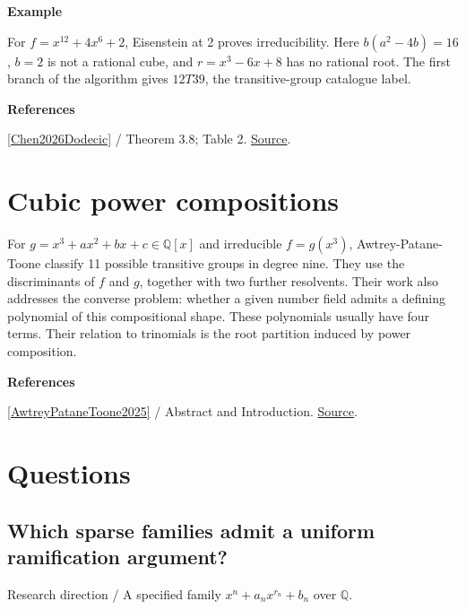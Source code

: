 \documentclass[11pt,a4paper,oneside,openany]{book}
\newenvironment{sources}{\par\smallskip\begingroup\footnotesize\color{atlasgray}\leftskip=10pt\setlength{\parskip}{2pt}}{\par\endgroup\smallskip}
\begin{document}
\begin{atlasblock}[standard]
\textbf{\sffamily Example}\par\smallskip
\color{black} For \(f=x^{12}+4x^6+2\), Eisenstein at 2 proves irreducibility. Here \(b(a^2-4b)=16\), \(b=2\) is not a rational cube, and \(r=x^3-6x+8\) has no rational root. The first branch of the algorithm gives \(12T39\), the transitive-group catalogue label.\par
\end{atlasblock}\color{black}
\begin{sources}
\textbf{References}\par\smallskip
\noindent\hyperlink{ref:Chen2026Dodecic}{[Chen2026Dodecic]} / Theorem 3.8; Table 2.  \href{https://doi.org/10.1515/ms-2026-0503}{Source}.\par
\end{sources}\color{black}
\section{Cubic power compositions}
\color{black} For \(g=x^3+ax^2+bx+c\in\mathbb Q[x]\) and irreducible \(f=g(x^3)\), Awtrey-Patane-Toone classify 11 possible transitive groups in degree nine. They use the discriminants of \(f\) and \(g\), together with two further resolvents. Their work also addresses the converse problem: whether a given number field admits a defining polynomial of this compositional shape. These polynomials usually have four terms. Their relation to trinomials is the root partition induced by power composition.\par
\begin{sources}
\textbf{References}\par\smallskip
\noindent\hyperlink{ref:AwtreyPataneToone2025}{[AwtreyPataneToone2025]} / Abstract and Introduction.  \href{https://doi.org/10.1017/S0004972725000048}{Source}.\par
\end{sources}\color{black}
\section*{Questions}
\subsection*{Which sparse families admit a uniform ramification argument?}
{\small\sffamily\color{atlasgold}Research direction / A specified family \(x^n+a_nx^{r_n}+b_n\) over \(\mathbb Q\).}\par\smallskip
\end{document}
